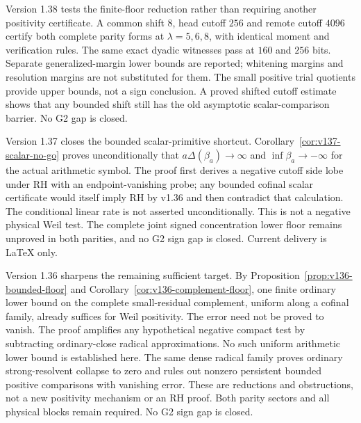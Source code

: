 \documentclass[11pt]{article}
\theoremstyle{remark}
\begin{document}
Version 1.38 tests the finite-floor reduction rather than requiring
another positivity certificate. A common shift $8$, head cutoff $256$
and remote cutoff $4096$ certify both complete parity forms at
$\lambda=5,6,8$, with identical moment and verification rules. The
same exact dyadic witnesses pass at $160$ and $256$ bits. Separate
generalized-margin lower bounds are reported; whitening margins and
resolution margins are not substituted for them. The small positive
trial quotients provide upper bounds, not a sign conclusion. A proved
shifted cutoff estimate shows that any bounded shift still has the
old asymptotic scalar-comparison barrier. No G2 gap is closed.

Version 1.37 closes the bounded scalar-primitive shortcut.
Corollary~\ref{cor:v137-scalar-no-go} proves unconditionally that
$a\Delta(\beta_a)\to\infty$ and $\inf\beta_a\to-\infty$ for the actual
arithmetic symbol. The proof first derives a negative cutoff side lobe
under RH with an endpoint-vanishing probe; any bounded cofinal scalar
certificate would itself imply RH by v1.36 and then contradict that
calculation. The conditional linear rate is not asserted unconditionally.
This is not a negative physical Weil test. The complete joint signed
concentration lower floor remains unproved in both parities, and no G2
sign gap is closed. Current delivery is LaTeX only.

Version 1.36 sharpens the remaining sufficient target. By
Proposition~\ref{prop:v136-bounded-floor} and
Corollary~\ref{cor:v136-complement-floor}, one finite ordinary lower bound
on the complete small-residual complement, uniform along a cofinal family,
already suffices for Weil positivity. The error need not be proved to
vanish. The proof amplifies any hypothetical negative compact test by
subtracting ordinary-close radical approximations. No such uniform
arithmetic lower bound is established here. The same dense radical family
proves ordinary strong-resolvent collapse to zero and rules out nonzero
persistent bounded positive comparisons with vanishing error. These are
reductions and obstructions, not a new positivity mechanism or an RH proof.
Both parity sectors and all physical blocks remain required. No G2 sign
gap is closed.
\end{document}
